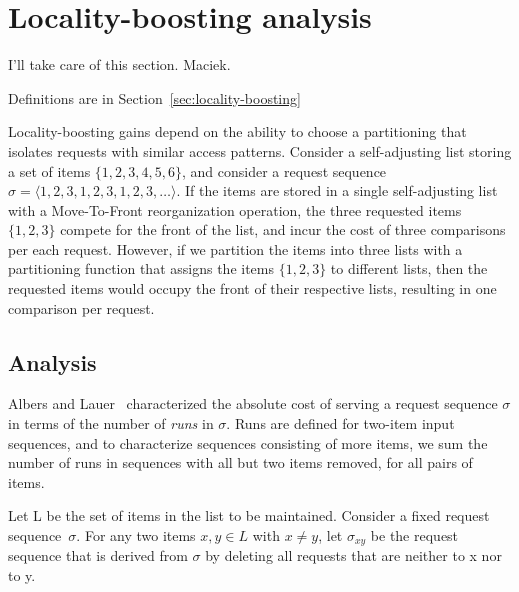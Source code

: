 \appendix

\section{Locality-boosting analysis}

I'll take care of this section. Maciek.


Definitions are in Section~\ref{sec:locality-boosting}

Locality-boosting gains depend on the ability to choose a partitioning that isolates requests with similar access patterns.
Consider a self-adjusting list
storing a set of items $\{ 1, 2, 3, 4, 5, 6 \}$, and consider a request sequence $\sigma = \langle 1, 2, 3, 1, 2, 3, 1, 2, 3, \ldots \rangle$.
If the items are stored in a single self-adjusting list with a Move-To-Front reorganization operation, the three requested items $\{1,2,3\}$ compete for the front of the list, and incur the cost of three comparisons per each request.
However, if we partition the items into three lists with a partitioning function that assigns the items $\{1, 2, 3\}$ to different lists, then the requested items would occupy the front of their respective lists, resulting in one comparison per request.

\subsection{Analysis}

Albers and Lauer~\cite{AlbersL16} characterized the absolute cost of serving a request sequence $\sigma$ in terms of the number of \emph{runs} in $\sigma$.
Runs are defined for two-item input sequences, and to characterize sequences consisting of more items, we sum the number of runs in sequences with all but two items removed, for all pairs of items.

\begin{definition}
	Let L be the set of items in the list to be maintained. Consider a fixed request sequence~$\sigma$. For any two items $x, y \in L$
	with $x \neq y$, let $\sigma_{xy}$ be the request sequence that is derived from $\sigma$ by deleting all requests that are neither to x nor
	to y.
\end{definition}

